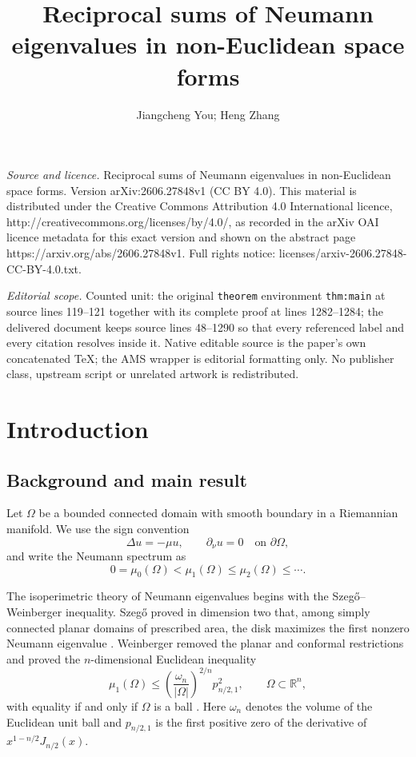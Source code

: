 \documentclass[10pt,a4paper]{amsart}
\newcommand{\RR}{\mathbb R}
\begin{document}
\title[Reciprocal sums of Neumann eigenvalues in non-Euclidean spac]{Reciprocal sums of Neumann eigenvalues in non-Euclidean space forms}
\author{Jiangcheng You; Heng Zhang}
\date{}
\maketitle
\noindent\emph{Source and licence.} Reciprocal sums of Neumann eigenvalues in non-Euclidean space forms. Version arXiv:2606.27848v1 (CC BY 4.0). This material is distributed under the Creative Commons Attribution 4.0 International licence, http://creativecommons.org/licenses/by/4.0/, as recorded in the arXiv OAI licence metadata for this exact version and shown on the abstract page https://arxiv.org/abs/2606.27848v1. Full rights notice: licenses/arxiv-2606.27848-CC-BY-4.0.txt.\par\smallskip
\noindent\textit{Editorial scope.} Counted unit: the original \texttt{theorem} environment \texttt{thm:main} at source lines 119--121 together with its complete proof at lines 1282--1284; the delivered document keeps source lines 48--1290 so that every referenced label and every citation resolves inside it. Native editable source is the paper's own concatenated TeX; the AMS wrapper is editorial formatting only. No publisher class, upstream script or unrelated artwork is redistributed.
\section{Introduction}
\subsection{Background and main result}
Let $\Omega$ be a bounded connected domain with smooth boundary in a Riemannian manifold.  We use the sign convention
$$
        \Delta u=-\mu u,
        \qquad
        \partial_\nu u=0 \quad \text{on }\partial\Omega,
$$
and write the Neumann spectrum as
$$
        0=\mu_0(\Omega)<\mu_1(\Omega)\le \mu_2(\Omega)\le\cdots .
$$


The isoperimetric theory of Neumann eigenvalues begins with the Szeg\H{o}--Weinberger inequality.  Szeg\H{o} proved in dimension two that, among simply connected planar domains of prescribed area, the disk maximizes the first nonzero Neumann eigenvalue \cite{Szego}.  Weinberger removed the planar and conformal restrictions and proved the $n$-dimensional Euclidean inequality
$$
        \mu_1(\Omega)
        \le \left(\frac{\omega_n}{|\Omega|}\right)^{2/n}p_{n/2,1}^2,
        \qquad \Omega\subset\RR^n,
$$
with equality if and only if $\Omega$ is a ball \cite{Weinberger}.  Here $\omega_n$ denotes the volume of the Euclidean unit ball and $p_{n/2,1}$ is the first positive zero of the derivative of $x^{1-n/2}J_{n/2}(x)$.
\end{document}
